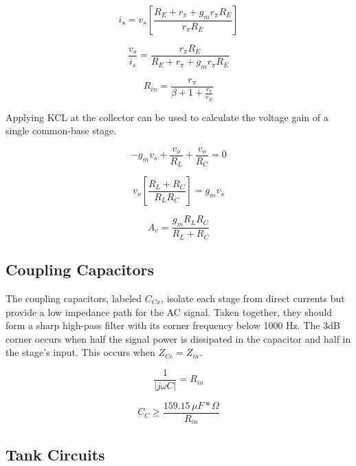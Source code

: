 \documentclass[titlepage, letterpaper, 11pt]{article}
\begin{document}
\begin{equation*}
i_{s}=v_{s} \left[
\frac{R_{E}+r_{\pi}+g_{m}r_{\pi}R_{E}}
{r_{\pi}R_{E}} \right]
\end{equation*}

\begin{equation*}
\frac{v_{s}}{i_{s}}
=\frac{r_{\pi}R_{E}}{R_{E}+r_{\pi}+g_{m}r_{\pi}R_{E}}
\end{equation*}

\begin{equation}
R_{in}=\frac{r_{\pi}}{\beta+1+\frac{r_{\pi}}{r_{E}}}
\label{commonBaseRin}
\end{equation}

Applying KCL at the collector can be used to calculate the voltage
gain of a single common-base stage.

\begin{equation*}
-g_{m}v_{s}+\frac{v_{o}}{R_{L}}+\frac{v_{o}}{R_{C}}=0
\end{equation*}

\begin{equation*}
v_{o}\left[\frac{R_{L}+R_{C}}{R_{L}R_{C}}\right]=g_{m}v_{s}
\end{equation*}

\begin{equation}
A_{v}=\frac{g_{m}R_{L}R_{C}}{R_{L}+R_{C}}
\end{equation}

\subsection{Coupling Capacitors}

The coupling capacitors, labeled $C_{Cx}$, isolate each stage from
direct currents but provide a low impedance path for the AC signal.
Taken together, they should form a sharp high-pass filter with its
corner frequency below 1000 Hz. The 3dB corner occurs when half the
signal power is dissipated in the capacitor and half in the stage's
input. This occurs when $Z_{Cc}=Z_{in}$.

\begin{equation*}
\frac{1}{|j\omega C|}=R_{in}
\end{equation*}

\begin{equation}
C_{C}\geq \frac{159.15\,\mu F*\Omega}{R_{in}}
\end{equation}

\subsection{Tank Circuits}
\end{document}
